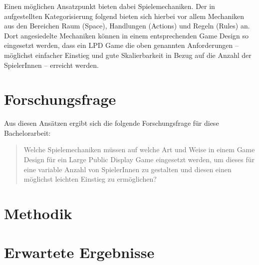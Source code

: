 Einen möglichen Ansatzpunkt bieten dabei Spielemechaniken. Der in \cite{Schell2008} aufgestellten Kategorisierung folgend bieten sich hierbei vor allem Mechaniken aus den Bereichen Raum (Space), Handlungen (Actions) und Regeln (Rules) an. Dort angesiedelte Mechaniken können in einem entsprechenden Game Design so eingesetzt werden, dass ein LPD Game die oben genannten Anforderungen -- möglichst einfacher Einstieg und gute Skalierbarkeit in Bezug auf die Anzahl der SpielerInnen -- erreicht werden.

\section{Forschungsfrage}

Aus diesen Ansätzen ergibt sich die folgende Forschungsfrage für diese Bachelorarbeit:

\begin{quote}
Welche Spielemechaniken müssen auf welche Art und Weise in einem Game Design für ein Large Public Display Game eingesetzt werden, um dieses für eine variable Anzahl von SpielerInnen zu gestalten und diesen einen möglichst leichten Einstieg zu ermöglichen?
\end{quote}

\section{Methodik}

\section{Erwartete Ergebnisse}